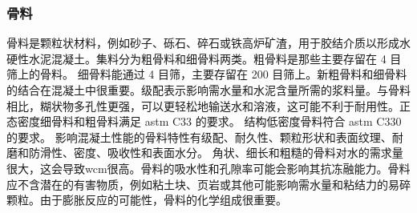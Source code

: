 \subsubsection{骨料}
骨料是颗粒状材料，例如砂子、砾石、碎石或铁高炉矿渣，用于胶结介质以形成水硬性水泥混凝土。集料分为粗骨料和细骨料两类。粗骨料是那些主要存留在 4 目筛上的骨料。 细骨料能通过 4 目筛，主要存留在 200 目筛上。新粗骨料和细骨料的结合在混凝土中很重要。级配表示影响需水量和水泥含量所需的浆料量。与骨料相比，糊状物多孔性更强，可以更轻松地输送水和溶液，这可能不利于耐用性。正态密度细骨料和粗骨料满足 \acrshort*{astm} C33 的要求。 结构低密度骨料符合 \acrshort*{astm} C330 的要求。 影响混凝土性能的骨料特性有级配、耐久性、颗粒形状和表面纹理、耐磨和防滑性、密度、吸收性和表面水分。 角状、细长和粗糙的骨料对水的需求量很大，这会导致\acrlong*{wcm}很高。骨料的吸水性和孔隙率可能会影响其抗冻融能力。骨料应不含潜在的有害物质，例如粘土块、页岩或其他可能影响需水量和粘结力的易碎颗粒。由于膨胀反应的可能性，骨料的化学组成很重要。

